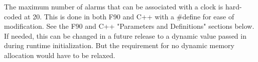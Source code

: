 
The maximum number of alarms that can be associated with a clock is hard-coded
at 20.  This is done in both F90 and  C++ with a \#define for ease of
modification.  See the F90 and C++ "Parameters and Definitions" sections below.
If needed, this can be changed in a future release to a dynamic value passed
in during runtime initialization.  But the requirement for no dynamic memory
allocation would have to be relaxed.
